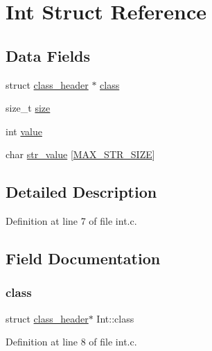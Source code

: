 \hypertarget{structInt}{}\section{Int Struct Reference}
\label{structInt}
\subsection*{Data Fields}
\begin{DoxyCompactItemize}
\item 
struct \mbox{\hyperlink{structclass__header}{class\+\_\+header}} $\ast$ \mbox{\hyperlink{structInt_aa497eee8de1a0588fe99440e34089b89}{class}}
\item 
size\+\_\+t \mbox{\hyperlink{structInt_a9a4308bb1dff85cd00c70f97bf4fbb8b}{size}}
\item 
int \mbox{\hyperlink{structInt_ab131a0721b22e28accfb39f0195413ab}{value}}
\item 
char \mbox{\hyperlink{structInt_a22a0684391962593f1320ab5039e4642}{str\+\_\+value}} \mbox{[}\mbox{\hyperlink{int_8c_a9c6918fbdb610a62c848aa680b81eb9a}{M\+A\+X\+\_\+\+S\+T\+R\+\_\+\+S\+I\+ZE}}\mbox{]}
\end{DoxyCompactItemize}


\subsection{Detailed Description}


Definition at line 7 of file int.\+c.



\subsection{Field Documentation}
\mbox{\label{structInt_aa497eee8de1a0588fe99440e34089b89}} 
\subsubsection{\texorpdfstring{class}{class}}
{\footnotesize\ttfamily struct \mbox{\hyperlink{structclass__header}{class\+\_\+header}}$\ast$ Int\+::class}



Definition at line 8 of file int.\+c.

\mbox{\label{structInt_a9a4308bb1dff85cd00c70f97bf4fbb8b}} 
